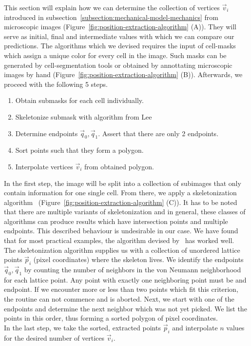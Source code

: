 \documentclass{article}
\begin{document}
This section will explain how we can determine the collection of vertices $\vec{v}_i$ introduced in
subsection~\ref{subsection:mechanical-model-mechanics} from microscopic images
(Figure~\ref{fig:position-extraction-algorithm} (A)).
They will serve as initial, final and intermediate values with which we can compare our predictions.
The algorithms which we devised requires the input of cell-masks which assign a unique color for
every cell in the image.
Such masks can be generated by cell-segmentation tools or obtained by annottating microscopic images
by hand (Figure~\ref{fig:position-extraction-algorithm} (B)).
Afterwards, we proceed with the following 5 steps.
\begin{enumerate}
    \item Obtain submasks for each cell individually.
    \item Skeletonize submask with algorithm from Lee~\cite{Lee1994}
    \item Determine endpoints $\vec{q}_0,\vec{q}_1$.
        Assert that there are only 2 endpoints.
    \item Sort points such that they form a polygon.
    \item Interpolate vertices $\vec{v}_i$ from obtained polygon.
\end{enumerate}
In the first step, the image will be split into a collection of subimages that only contain
information for one single cell.
From there, we apply a skeletonization algorithm~\cite{Lee1994}
(Figure~\ref{fig:position-extraction-algorithm} (C)).
It has to be noted that there are multiple variants of skeletonization and in general, these classes
of algorithms can produce results which have intersection points and multiple endpoints.
This described behaviour is undesirable in our case.
We have found that for most practical examples, the algorithm devised by~\cite{Lee1994} has worked
well.\\
The skeletonization algorithm supplies us with a collection of unordered lattice points $\vec{p}_i$
(pixel coordinates) where the skeleton lives.
We identify the endpoints $\vec{q}_0,\vec{q}_1$ by counting the number of neighbors in the von
Neumann neighborhood for each lattice point.
Any point with exactly one neighboring point must be and endpoint.
If we encounter more or less than two points which fit this criterion, the routine can not commence
and is aborted.
Next, we start with one of the endpoints and determine the next neighbor which was not yet picked.
We list the points in this order, thus forming a sorted polygon of pixel coordinates.\\
In the last step, we take the sorted, extracted points $\vec{p}_i$ and interpolate $n$ values for
the desired number of vertices $\vec{v}_i$.
\end{document}
